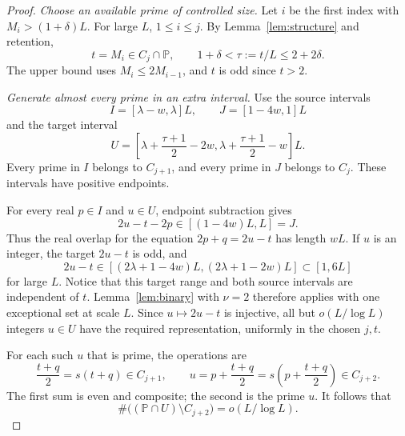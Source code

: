 \documentclass[11pt,letterpaper]{article}
\numberwithin{equation}{section}
\theoremstyle{definition}
\theoremstyle{remark}
\newcommand{\Pp}{\mathbb P}
\begin{document}
\begin{proof}
\emph{Choose an available prime of controlled size.}
Let $i$ be the first index with $M_i>(1+\delta)L$. For large $L$,
$1\le i\le j$. By Lemma~\ref{lem:structure} and retention,
\begin{equation}\label{eq:outlier}
 t=M_i\in C_j\cap\Pp,\qquad
 1+\delta<\tau:=t/L\le2+2\delta.
\end{equation}
The upper bound uses $M_i\le2M_{i-1}$, and $t$ is odd since $t>2$.

\emph{Generate almost every prime in an extra interval.}
Use the source intervals
\begin{equation}\label{eq:boost-source}
 I=[\lambda-w,\lambda]L,\qquad J=[1-4w,1]L
\end{equation}
and the target interval
\begin{equation}\label{eq:boost-target}
 U=\left[\lambda+\frac{\tau+1}{2}-2w,
          \lambda+\frac{\tau+1}{2}-w\right]L.
\end{equation}
Every prime in $I$ belongs to $C_{j+1}$, and every prime in $J$ belongs
to $C_j$. These intervals have positive endpoints.

For every real $p\in I$ and $u\in U$, endpoint subtraction gives
\begin{equation}\label{eq:boost-overlap}
 2u-t-2p\in[(1-4w)L,L]=J.
\end{equation}
Thus the real overlap for the equation $2p+q=2u-t$ has length $wL$.
If $u$ is an integer, the target $2u-t$ is odd, and
\[
 2u-t\in[(2\lambda+1-4w)L,(2\lambda+1-2w)L]\subset[1,6L]
\]
for large $L$. Notice that this target range and both source intervals
are independent of $t$. Lemma~\ref{lem:binary} with $\nu=2$ therefore
applies with one exceptional set at scale $L$. Since $u\mapsto2u-t$ is
injective, all but $o(L/\log L)$ integers $u\in U$ have the required
representation, uniformly in the chosen $j,t$.

For each such $u$ that is prime, the operations are
\begin{equation}\label{eq:boost-operations}
 \frac{t+q}{2}=s(t+q)\in C_{j+1},\qquad
 u=p+\frac{t+q}{2}=s\left(p+\frac{t+q}{2}\right)\in C_{j+2}.
\end{equation}
The first sum is even and composite; the second is the prime $u$.
It follows that
\begin{equation}\label{eq:extra-primes}
 \#\bigl((\Pp\cap U)\setminus C_{j+2}\bigr)=o(L/\log L).
\end{equation}


\end{proof}
\end{document}
